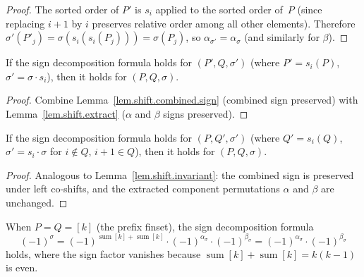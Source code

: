 \begin{proof}
The sorted order of $P'$ is $s_i$ applied to the sorted order of~$P$
(since replacing $i{+}1$ by $i$ preserves relative order among all
other elements).  Therefore
$\sigma'(P'_j) = \sigma(s_i(s_i(P_j))) = \sigma(P_j)$,
so $\alpha_{\sigma'} = \alpha_\sigma$ (and similarly for $\beta$).
\end{proof}

\begin{lemma}
\label{lem.shift.invariant}
\leanhelper
\leanok
If the sign decomposition formula holds for $(P', Q, \sigma')$
(where $P' = s_i(P)$, $\sigma' = \sigma\cdot s_i$), then it
holds for $(P, Q, \sigma)$.
\end{lemma}

\begin{proof}
\leanok
Combine Lemma~\ref{lem.shift.combined.sign} (combined sign preserved)
with Lemma~\ref{lem.shift.extract} ($\alpha$ and $\beta$ signs preserved).
\end{proof}

\begin{lemma}
\label{lem.coshift.invariant}
\leanhelper
\leanok
If the sign decomposition formula holds for $(P, Q', \sigma')$
(where $Q' = s_i(Q)$, $\sigma' = s_i\cdot\sigma$ for $i\notin Q$,
$i{+}1\in Q$), then it holds for $(P, Q, \sigma)$.
\end{lemma}

\begin{proof}
\leanok
Analogous to Lemma~\ref{lem.shift.invariant}: the combined sign
is preserved under left co-shifts, and the extracted component
permutations $\alpha$ and $\beta$ are unchanged.
\end{proof}

\begin{lemma}
\label{lem.sign.decomposition.prefix}
\leanhelper
\leanok
When $P = Q = [k]$ (the prefix finset), the sign decomposition formula
\[
(-1)^{\sigma}
= (-1)^{\operatorname{sum}[k]+\operatorname{sum}[k]}
\cdot (-1)^{\alpha_\sigma}\cdot (-1)^{\beta_\sigma}
= (-1)^{\alpha_\sigma}\cdot (-1)^{\beta_\sigma}
\]
holds, where the sign factor vanishes because
$\operatorname{sum}[k] + \operatorname{sum}[k] = k(k-1)$ is even.
\end{lemma}


